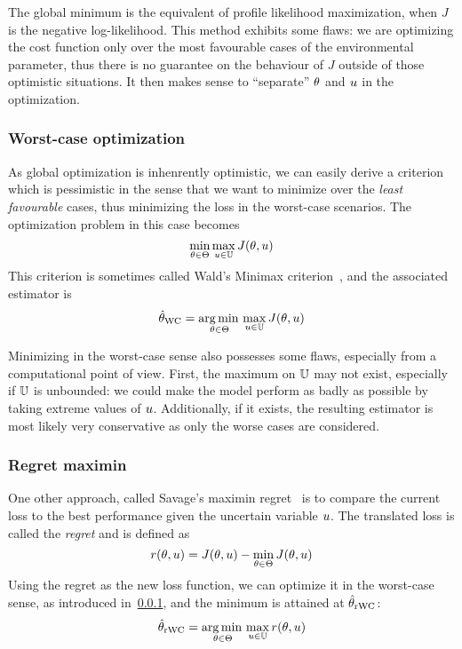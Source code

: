 \documentclass[../../Main_ManuscritThese.tex]{subfiles}
\begin{document}
The global minimum is the equivalent of profile likelihood maximization, when $J$ is the negative log-likelihood. This method exhibits some flaws: we are  optimizing the cost function only over the most favourable cases of the environmental parameter, thus  there is no guarantee on the behaviour of $J$ outside of those optimistic situations.
It then makes sense to ``separate'' $\theta$ and $u$ in the optimization.

\subsubsection{Worst-case optimization}
\label{sec:saddle_point}
As global optimization is inhenrently optimistic, we can easily derive a criterion which is pessimistic in the sense that we want to minimize over the \emph{least favourable} cases, thus minimizing the loss in the worst-case scenarios. The optimization problem in this case becomes
\begin{equation}
  \min_{\theta\in\Theta} \max_{u \in \mathbb{U}} J(\theta,u)
\end{equation}
This criterion is sometimes called Wald's Minimax criterion~\cite{wald_statistical_1945}, and the associated estimator is
\begin{equation}
  \label{eq:kkwc}
  \hat{\theta}_{\mathrm{WC}} =  \operatorname*{arg\,min \,}_{\theta \in \Theta} \max_{u \in \mathbb{U}} J(\theta, u)
\end{equation}

Minimizing in the worst-case sense also possesses some flaws, especially from a computational point of view.
First, the maximum on $\mathbb{U}$ may not exist, especially if $\mathbb{U}$ is unbounded: we could make the model perform as badly as possible by taking extreme values of $u$. 
Additionally, if it exists, the resulting estimator is most likely very conservative as only the worse cases are considered.

\subsubsection{Regret maximin}
\label{ssec:regret_savage}
One other approach, called Savage's maximin regret~\cite{savage_theory_1951} is to compare the current loss to the best performance given the uncertain variable $u$. The translated loss is called the \emph{regret} and is defined as
\begin{equation}
  r(\theta, u) = J(\theta, u) - \min_{\theta \in \Theta} J(\theta, u)
\end{equation}
Using the regret as the new loss function, we can optimize it in the worst-case sense, as introduced in~\cref{sec:saddle_point}, and the minimum is attained at $\hat{\theta}_{\mathrm{rWC}}$:
\begin{equation}
  \hat{\theta}_{\mathrm{rWC}} = \operatorname*{arg\,min \,}_{\theta\in\Theta} \max_{u \in \mathbb{U}} r(\theta, u)
\end{equation}
\end{document}
